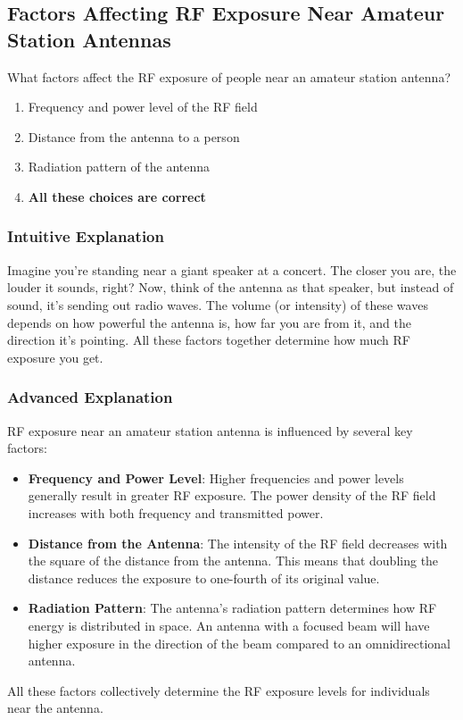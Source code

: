 \subsection{Factors Affecting RF Exposure Near Amateur Station Antennas}
\label{T0C04}

\begin{tcolorbox}[colback=gray!10!white,colframe=black!75!black,title=T0C04]
What factors affect the RF exposure of people near an amateur station antenna?
\begin{enumerate}[noitemsep]
    \item Frequency and power level of the RF field
    \item Distance from the antenna to a person
    \item Radiation pattern of the antenna
    \item \textbf{All these choices are correct}
\end{enumerate}
\end{tcolorbox}

\subsubsection*{Intuitive Explanation}
Imagine you're standing near a giant speaker at a concert. The closer you are, the louder it sounds, right? Now, think of the antenna as that speaker, but instead of sound, it's sending out radio waves. The volume (or intensity) of these waves depends on how powerful the antenna is, how far you are from it, and the direction it's pointing. All these factors together determine how much RF exposure you get.

\subsubsection*{Advanced Explanation}
RF exposure near an amateur station antenna is influenced by several key factors:
\begin{itemize}
    \item \textbf{Frequency and Power Level}: Higher frequencies and power levels generally result in greater RF exposure. The power density of the RF field increases with both frequency and transmitted power.
    \item \textbf{Distance from the Antenna}: The intensity of the RF field decreases with the square of the distance from the antenna. This means that doubling the distance reduces the exposure to one-fourth of its original value.
    \item \textbf{Radiation Pattern}: The antenna's radiation pattern determines how RF energy is distributed in space. An antenna with a focused beam will have higher exposure in the direction of the beam compared to an omnidirectional antenna.
\end{itemize}
All these factors collectively determine the RF exposure levels for individuals near the antenna.

